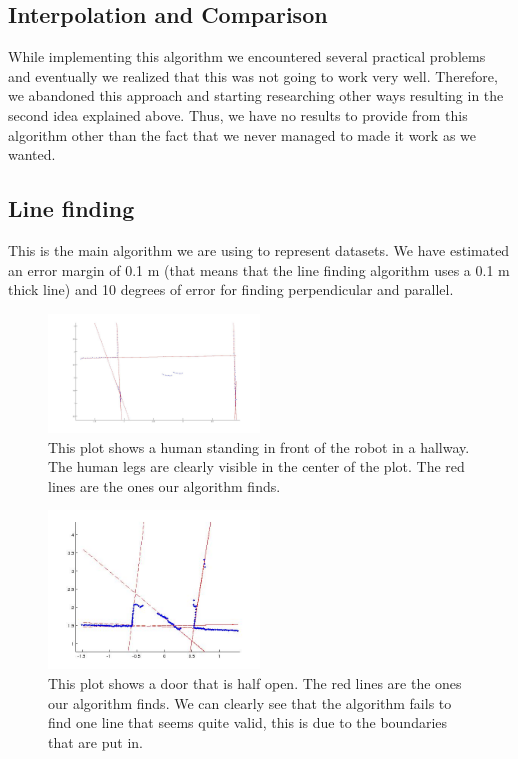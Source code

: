\documentclass[a4paper, 10pt, conference]{ieeeconf}      %
\begin{document}
\subsection{Interpolation and Comparison}
While implementing this algorithm we encountered several practical problems and eventually we realized that this was not going to work very well. Therefore, we abandoned this approach and starting researching other ways resulting in the second idea explained above. Thus, we have no results to provide from this algorithm other than the fact that we never managed to made it work as we wanted.

\subsection{Line finding}
This is the main algorithm we are using to represent datasets. We have estimated an error margin of 0.1 m (that means that the line finding algorithm uses a 0.1 m thick line) and 10 degrees of error for finding perpendicular and parallel. 

\begin{figure}
\centering
\includegraphics[width=0.5\textwidth]{presimg/humanlines.jpg}
\caption{This plot shows a human standing in front of the robot in a hallway. The human legs are clearly visible in the center of the plot. The red lines are the ones our algorithm finds.}
\label{human}
\end{figure}

\begin{figure}
\centering
\includegraphics[width=0.5\textwidth]{presimg/doorhalflines.jpg}
\caption{This plot shows a door that is half open. The red lines are the ones our algorithm finds. We can clearly see that the algorithm fails to find one line that seems quite valid, this is due to the boundaries that are put in.}
\label{doorhalf}
\end{figure}
\end{document}
